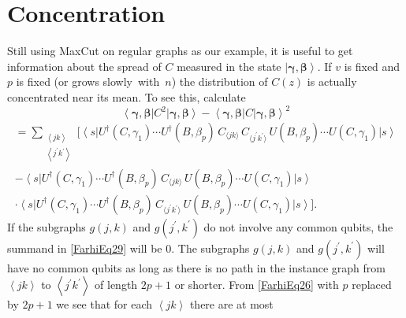 \documentclass[t11pt,reprint,preprint,preprintnumbers]{revtex4}
\newcommand{\bra}[1]{\left\langle #1 \right|}
\newcommand{\ket}[1]{\left|#1\right\rangle}
\newcommand{\brake}[1]{\left\langle#1\right\rangle}
\begin{document}
\section{Concentration}
Still using MaxCut on regular graphs as our example, it is useful to get information about the spread of $C$ measured in the state $\ket{\boldsymbol{\gamma}, \boldsymbol{\beta}}$.
If $v$ is fixed and $p$ is fixed (or grows \mbox{slowly with $n$)} the distribution of $C(z)$ is actually concentrated near its mean. To see this, calculate 
\begin{equation}
\bra{\boldsymbol{\gamma}, \boldsymbol{\beta}} C^2\ket{\boldsymbol{\gamma}, \boldsymbol{\beta}} - \bra{\boldsymbol{\gamma}, \boldsymbol{\beta}} C \ket{\boldsymbol{\gamma}, \boldsymbol{\beta}}^2
\label{FarhiEq27}
\end{equation}
\begin{multline}
= \sum\limits_{\substack{\brake{jk}\\ \brake{j^\prime k^\prime}}} \Bigg[  \bra{s} U^\dagger (C, \gamma_1) \cdots U^\dagger (B, \beta_p)\,C_{\langle j k\rangle}\,C_{\langle j^\prime k^\prime\rangle}\, U (B, \beta_p) \cdots U (C, \gamma_1) \ket{s}\\[-1.5ex]
	- \bra{s} U^\dagger (C, \gamma_1) \cdots U^\dagger (B, \beta_p)\, C_{\langle j k\rangle}\, U (B, \beta_p) \cdots U (C, \gamma_1) \ket{s} \\
	\cdot \bra{s} U^\dagger (C, \gamma_1) \cdots U^\dagger (B, \beta_p)\, C_{\langle j^\prime k^\prime\rangle}\, U (B, \beta_p) \cdots U (C, \gamma_1) \ket{s} \Bigg] .
\label{FarhiEq29}
\end{multline}
If the subgraphs $g(j,k)$ and $g(j^\prime,k^\prime)$ do not involve any common qubits, the summand in \eqref{FarhiEq29} will be 0. The subgraphs $g(j,k)$ and $g(j^\prime,k^\prime)$ will have no common qubits as long as there is no path in the instance graph  from $\brake{jk}$ to $\brake{j^\prime k^\prime}$ of length $2p + 1$ or shorter. From \eqref{FarhiEq26} with $p$ replaced by $2p+1$ we see that for each $\brake{jk}$ there are at most
\end{document}

